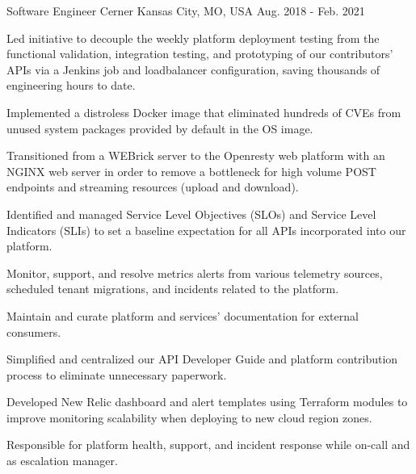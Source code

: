 \begin{cventries}
  \cventry
    {Software Engineer} %
    {Cerner} %
    {Kansas City, MO, USA} %
    {Aug. 2018 - Feb. 2021} %
    {
      \begin{cvitems} %
        \item {Led initiative to decouple the weekly platform deployment testing from the functional validation, integration testing, and prototyping of our contributors' APIs via a Jenkins job and loadbalancer configuration, saving thousands of engineering hours to date.}
        \item {Implemented a distroless Docker image that eliminated hundreds of CVEs from unused system packages provided by default in the OS image.}
        \item {Transitioned from a WEBrick server to the Openresty web platform with an NGINX web server in order to remove a bottleneck for high volume POST endpoints and streaming resources (upload and download).}
        \item {Identified and managed Service Level Objectives (SLOs) and Service Level Indicators (SLIs) to set a baseline expectation for all APIs incorporated into our platform.}
        \item {Monitor, support, and resolve metrics alerts from various telemetry sources, scheduled tenant migrations, and incidents related to the platform.}
        \item {Maintain and curate platform and services' documentation for external consumers.}
        \item {Simplified and centralized our API Developer Guide and platform contribution process to eliminate unnecessary paperwork.}
        \item {Developed New Relic dashboard and alert templates using Terraform modules to improve monitoring scalability when deploying to new cloud region zones.}
        \item {Responsible for platform health, support, and incident response while on-call and as escalation manager.}
      \end{cvitems}
    }

\end{cventries}

